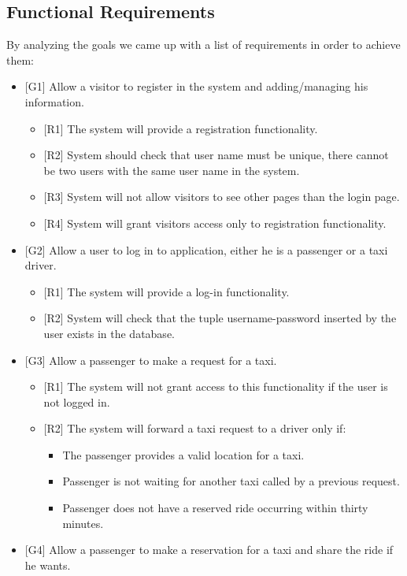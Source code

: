 \subsection{Functional Requirements}
By analyzing the goals we came up with a list of requirements in order to achieve them:
	\begin{itemize}
		\item {[G1]} Allow a visitor to register in the system and adding/managing his information.
			\begin{itemize}
				\item {[R1]} The system will provide a registration functionality.
				\item {[R2]} System should check that user name must be unique, there cannot be two users with the same user name in the system.
				\item {[R3]} System will not allow visitors to see other pages than the login page.
				\item {[R4]} System will grant visitors access only to registration functionality.
			\end{itemize}
		\item {[G2]} Allow a user to log in to application, either he is a passenger or a taxi driver.
			\begin{itemize}
				\item {[R1]} The system will provide a log-in functionality.
				\item {[R2]} System will check that the tuple username-password inserted by the user exists in the database.
			\end{itemize}
		\item {[G3]} Allow a passenger to make a request for a taxi.
	\begin{itemize}
		\item {[R1]} The system will not grant access to this functionality if the user is not logged in.
		\item {[R2]} The system will forward a taxi request to a driver only if:
		\begin{itemize}
			\item The passenger provides a valid location for a taxi.
			\item Passenger is not waiting for another taxi called by a previous request.
			\item Passenger does not have a reserved ride occurring within thirty minutes.
		\end{itemize}
	\end{itemize}
		\item {[G4]} Allow a passenger to make a reservation for a taxi and share the ride if he wants.

\end{itemize}
